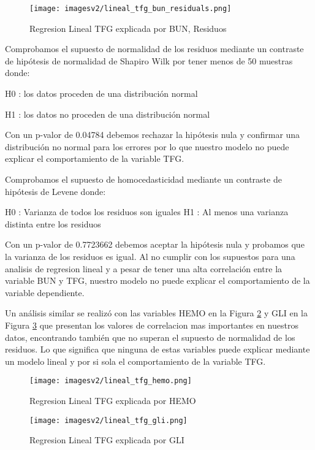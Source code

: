 \documentclass[runningheads,a4paper]{llncs}
\begin{document}
\begin{figure}[!ht]
\centering
\texttt{[image: imagesv2/lineal\_tfg\_bun\_residuals.png]}
\caption{Regresion Lineal TFG explicada por BUN, Residuos }
\label{fig:lineal_tfg_bun_residuals}
\end{figure}


Comprobamos el supuesto de normalidad de los residuos mediante un contraste de hipótesis de normalidad de Shapiro Wilk por tener menos de 50 muestras donde: 

H0 : los datos proceden de una distribución normal
 
H1 : los datos no proceden de una distribución normal

Con un p-valor de 0.04784 debemos rechazar la hipótesis nula y confirmar una distribución no normal para los errores por lo que nuestro modelo no puede explicar el comportamiento de la variable \ac{TFG}.

Comprobamos el supuesto de homocedasticidad mediante un contraste de hipótesis de Levene donde:

H0 : Varianza de todos los residuos son iguales
H1 : Al menos una varianza distinta entre los residuos 

Con un p-valor de 0.7723662 debemos aceptar la hipótesis nula y probamos que la varianza de los residuos es igual. Al no cumplir con los supuestos para una analisis de regresion lineal y a pesar de tener una alta correlación entre la variable BUN y TFG, nuestro modelo no puede explicar el comportamiento de la variable dependiente.

Un análisis similar se realizó con las variables \ac{HEMO} en la Figura  \ref{fig:lineal_tfg_hemo} y \ac{GLI} en la Figura \ref{fig:lineal_tfg_gli} que presentan los valores de correlacion mas importantes en nuestros datos, encontrando también que no superan el supuesto de normalidad de los residuos. Lo que significa que ninguna de estas variables puede explicar mediante un modelo lineal y por si sola el comportamiento de la variable \ac{TFG}.

\begin{figure}[!ht]
\centering
\texttt{[image: imagesv2/lineal\_tfg\_hemo.png]}
\caption{Regresion Lineal TFG explicada por HEMO  }
\label{fig:lineal_tfg_hemo}
\end{figure}

\begin{figure}[!ht]
\centering
\texttt{[image: imagesv2/lineal\_tfg\_gli.png]}
\caption{Regresion Lineal TFG explicada por GLI  }
\label{fig:lineal_tfg_gli}
\end{figure}
\end{document}
